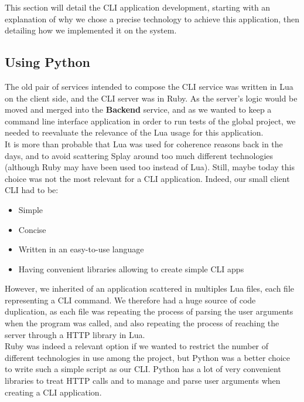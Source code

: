 \documentclass{eplmastersthesis}
\begin{document}
      This section will detail the CLI application development, starting
      with an explanation of why we chose a precise technology to achieve
      this application, then detailing how we implemented it on the system.

      \subsection{Using Python}

        The old pair of services intended to compose the CLI service was
        written in Lua on the client side, and the CLI server was in Ruby. As
        the server's logic would be moved and merged into the \textbf{Backend}
        service, and as we wanted to keep a command line interface application
        in order to run tests of the global project, we needed to reevaluate
        the relevance of the Lua usage for this application.\\

        It is more than probable that Lua was used for coherence reasons back
        in the days, and to avoid scattering Splay around too much different
        technologies (although Ruby may have been used too instead of Lua).
        Still, maybe today this choice was not the most relevant for a CLI
        application. Indeed, our small client CLI had to be:

        \begin{itemize}
          \item Simple
          \item Concise
          \item Written in an easy-to-use language
          \item Having convenient libraries allowing to create simple CLI apps
        \end{itemize}

        However, we inherited of an application scattered in multiples Lua
        files, each file representing a CLI command. We therefore had a huge
        source of code duplication, as each file was repeating the process
        of parsing the user arguments when the program was called, and also
        repeating the process of reaching the server through a HTTP library
        in Lua.\\
        Ruby was indeed a relevant option if we wanted to restrict the number
        of different technologies in use among the project, but Python was
        a better choice to write such a simple script as our CLI. Python has
        a lot of very convenient libraries to treat HTTP calls and to
        manage and parse user arguments when creating a CLI application.
\end{document}
